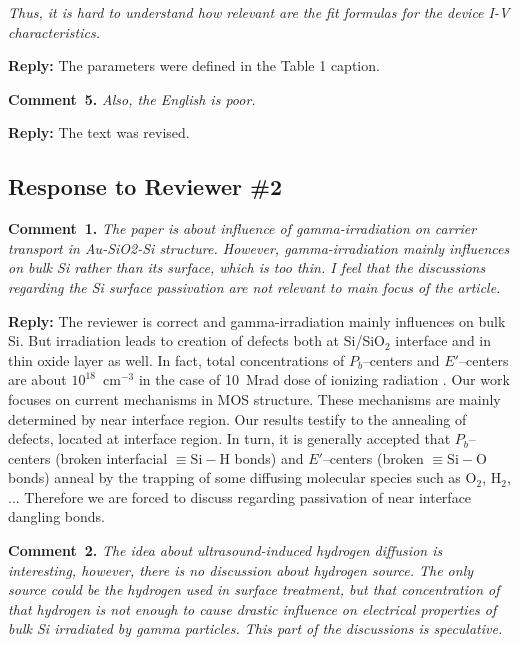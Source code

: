\documentclass[aip,jap,preprint]{revtex4-1}
\begin{document}
\emph{Thus, it is hard to understand how relevant are the fit formulas for the device I-V characteristics.}


\noindent
\textcolor[rgb]{0.51,0.00,0.00}{\textbf{Reply:}}
The parameters were defined in the Table 1 caption.




\noindent
\textcolor[rgb]{0.00,0.50,1.00}{\textbf{Comment~5.}}
\emph{Also, the English is poor.}


\noindent
\textcolor[rgb]{0.51,0.00,0.00}{\textbf{Reply:}}
The text was revised.


\subsection*{Response to Reviewer \#2 }

\noindent
\textcolor[rgb]{0.00,0.50,1.00}{\textbf{Comment~1.}}
\emph{ The paper is about influence of gamma-irradiation on carrier transport in Au-SiO2-Si structure. However, gamma-irradiation mainly influences on bulk Si rather than its surface, which is too thin. I feel that the discussions regarding the Si surface passivation are not relevant to main focus of the article.}

\noindent
\textcolor[rgb]{0.51,0.00,0.00}{\textbf{Reply:}}
The reviewer is correct and gamma-irradiation mainly influences on bulk Si.
But irradiation leads to creation of defects both at Si/SiO$_2$  interface and in thin oxide layer as well.
In fact, total concentrations of $P_b$--centers and $E'$--centers are about $10^{18}$~cm$^{-3}$
in the case of 10~Mrad dose of ionizing radiation \cite{Fleetwood,PersenkovBook}.
Our work focuses on current mechanisms in MOS structure.
These mechanisms are mainly determined by near interface region.
Our results testify to the annealing  of defects, located at interface region.
In turn, it  is generally accepted \cite{SiO2:Devine,SiO2:Mahapatra} that $P_b$--centers (broken interfacial $\equiv\!\mathrm{Si}\!-\!\mathrm{H}$ bonds) and $E'$--centers (broken $\equiv\!\mathrm{Si}\!-\!\mathrm{O}$ bonds) anneal by  the
trapping  of  some  diffusing molecular species  such as  $\text{O}_2$, $\text{H}_2$, ...
Therefore we are forced to discuss regarding passivation of near interface dangling bonds.




\noindent
\textcolor[rgb]{0.00,0.50,1.00}{\textbf{Comment~2.}}
\emph{ The idea about ultrasound-induced hydrogen diffusion is interesting, however, there is no discussion about hydrogen source. The only source could be the hydrogen used in surface treatment, but that concentration of that hydrogen is not enough to cause drastic influence on electrical properties of bulk Si irradiated by gamma particles. This part of the discussions is speculative.}
\end{document}
